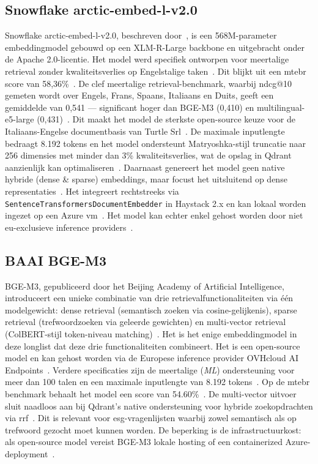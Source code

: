\subsection{Snowflake arctic-embed-l-v2.0}

Snowflake arctic-embed-l-v2.0, beschreven door~\textcite{YuEtAl2024}, is een 568M-parameter embeddingmodel gebouwd op een XLM-R-Large backbone en uitgebracht onder de Apache 2.0-licentie. Het model werd specifiek ontworpen voor meertalige retrieval zonder kwaliteitsverlies op Engelstalige taken~\autocite{Snowflakezd}. Dit blijkt uit een \gls{mtebr} score van 58,36\%~\autocite{MTEBzd}. De \gls{clef} meertalige retrieval-benchmark, waarbij \gls{ndcg@10} gemeten wordt over Engels, Frans, Spaans, Italiaans en Duits, geeft een gemiddelde van 0,541 — significant hoger dan BGE-M3 (0,410) en multilingual-e5-large (0,431)~\autocite{YuEtAl2024}. Dit maakt het model de sterkste open-source keuze voor de Italiaans-Engelse documentbasis van Turtle Srl~\autocite{YuEtAl2024}. De maximale inputlengte bedraagt 8.192 tokens en het model ondersteunt Matryoshka-stijl truncatie naar 256 dimensies met minder dan 3\% kwaliteitsverlies, wat de opslag in Qdrant aanzienlijk kan optimaliseren~\autocite{Xu2025}. Daarnaast genereert het model geen native hybride (dense \& sparse) embeddings, maar focust het uitsluitend op dense representaties~\autocite{YuEtAl2024}. Het integreert rechtstreeks via \texttt{SentenceTransformersDocumentEmbedder} in Haystack 2.x en kan lokaal worden ingezet op een Azure \gls{vm}~\autocite{HuggingFacezd}. Het model kan echter enkel gehost worden door niet \gls{eu}-exclusieve inference providers~\autocite{Snowflakezd}.

\subsection{BAAI BGE-M3}

BGE-M3, gepubliceerd door het Beijing Academy of Artificial Intelligence, introduceert een unieke combinatie van drie retrievalfunctionaliteiten via één modelgewicht: dense retrieval (semantisch zoeken via cosine-gelijkenis), sparse retrieval (trefwoordzoeken via geleerde gewichten) en multi-vector retrieval (ColBERT-stijl token-niveau matching)~\autocite{Chen2024}. Het is het enige embeddingmodel in deze longlist dat deze drie functionaliteiten combineert. Het is een open-source model en kan gehost worden via de Europese inference provider OVHcloud AI Endpoints~\autocite{OVHcloud2024}. Verdere specificaties zijn de meertalige (\textit{ML}) ondersteuning voor meer dan 100 talen en een maximale inputlengte van 8.192 tokens~\autocite{Chen2024}. Op de \gls{mtebr} benchmark behaalt het model een score van 54.60\%~\autocite{MTEBzd}. De multi-vector uitvoer sluit naadloos aan bij Qdrant's native ondersteuning voor hybride zoekopdrachten via \gls{rrf}~\autocite{QdrantHybrid2025}. Dit is relevant voor \gls{esg}-vragenlijsten waarbij zowel semantisch als op trefwoord gezocht moet kunnen worden. De beperking is de infrastructuurkost: als open-source model vereist BGE-M3 lokale hosting of een containerized Azure-deployment~\autocite{BAAI2024}.

